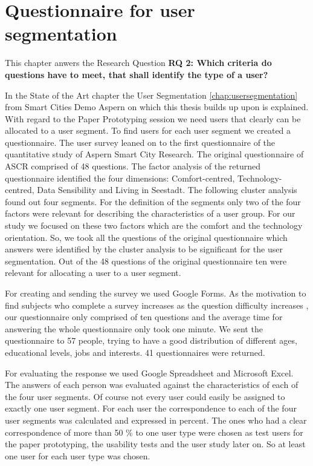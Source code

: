 \chapter{Questionnaire for user segmentation}
This chapter anwers the Research Question \textbf{RQ 2: Which criteria do questions have to meet, that shall identify the type of a user?}


In the State of the Art chapter the User Segmentation \ref{chap:usersegmentation} from Smart Cities Demo Aspern on which this thesis builds up upon is explained. With regard to the Paper Prototyping session we need users that clearly can be allocated to a user segment. To find users for each user segment we created a questionnaire. The user survey leaned on to the first questionnaire of the quantitative study of Aspern Smart City Research. The original questionnaire of ASCR comprised of 48 questions. The factor analysis of the returned questionnaire identified the four dimensions: Comfort-centred, Technology-centred, Data Sensibility and Living in Seestadt. The following cluster analysis found out four segments. For the definition of the segments only two of the four factors were relevant for describing the characteristics of a user group. For our study we focused on these two factors which are the comfort and the technology orientation. So, we took all the questions of the original questionnaire which answers were identified by the cluster analysis to be significant for the user segmentation. Out of the 48 questions of the original questionnaire ten were relevant for allocating a user to a user segment.

For creating and sending the survey we used Google Forms. As the motivation to find subjects who complete a survey increases as the question difficulty increases \cite{andrews2007conducting}, our questionnaire only comprised of ten questions and the average time for answering the whole questionnaire only took one minute. We sent the questionnaire to 57 people, trying to have a good distribution of different ages, educational levels, jobs and interests. 41 questionnaires were returned.

For evaluating the response we used Google Spreadsheet and Microsoft Excel. The answers of each person was evaluated against the characteristics of each of the four user segments. Of course not every user could easily be assigned to exactly one user segment. For each user the correspondence to each of the four user segments was calculated and expressed in percent. The ones who had a clear correspondence of more than 50 \% to one user type were chosen as test users for the paper prototyping, the usability tests and the user study later on. So at least one user for each user type was chosen. 

